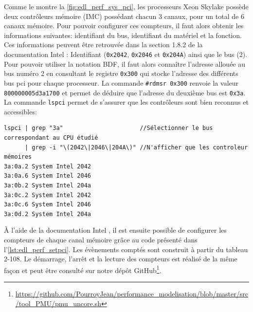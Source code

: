     Comme le montre la \autoref{fig:edl_perf_sys_pci}, les processeurs Xeon Skylake possède deux contrôleurs mémoire (IMC) possédant chacun 3 canaux, pour un total de 6 canaux mémoire. Pour pouvoir configurer ces compteurs, il faut alors obtenir les informations suivantes: identifiant du bus, identifiant du matériel et la fonction. Ces informations peuvent être retrouvée dans la section 1.8.2 de la documentation Intel \cite{Intel2017b}: Identifiant (\verb|0x2042|, \verb|0x2046| et \verb|0x204A|) ainsi que le bus  (2). Pour pouvoir utiliser la notation BDF, il faut alors connaître l'adresse allouée au bus numéro 2 en consultant le registre \verb|0x300| qui stocke l'adresse des différents bus pci pour chaque processeur. La commande \verb|#rdmsr 0x300| renvoie la valeur \verb|800000005d3a1700| et permet de déduire que l'adresse du deuxième bus est \verb|0x3a|. La commande \verb|lspci| permet de s'assurer que les contrôleurs sont bien reconnus et accessibles:
\begin{verbatim}
lspci | grep "3a"                      //Sélectionner le bus correspondant au CPU étudié
      | grep -i "\(2042\|2046\|204A\)" //N'afficher que les controleur mémoires
3a:0a.2 System Intel 2042 
3a:0a.6 System Intel 2046 
3a:0b.2 System Intel 204a 
3a:0c.2 System Intel 2042
3a:0c.6 System Intel 2046 
3a:0d.2 System Intel 204a
\end{verbatim}
    
    À l'aide de la documentation Intel \cite{Intel2017b}, il est ensuite possible de configurer les compteurs de chaque canal mémoire grâce au code présenté dans l'\autoref{lst:edl_perf_setpci}. Les évènements comptés sont construit à partir du tableau 2-108. Le démarrage, l'arrêt et la lecture des compteurs est réalisé de la même façon et peut être consulté sur notre dépôt GitHub\footnote{\url{https://github.com/PourroyJean/performance_modelisation/blob/master/src/tool_PMU/pmu_uncore.sh}}. 

